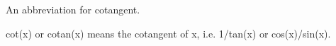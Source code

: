 An abbreviation for cotangent.
\par
cot(x) or cotan(x) means the cotangent of x, i.e. 1/tan(x) or cos(x)/sin(x).